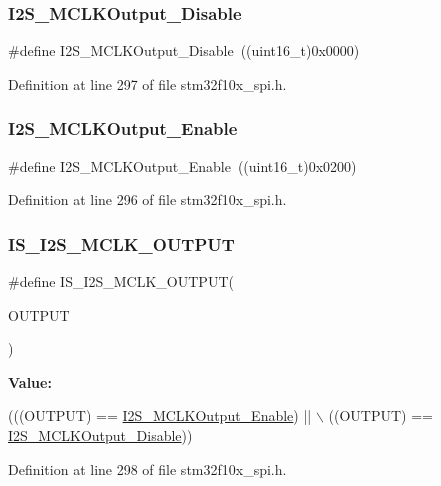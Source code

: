 \subsubsection{\texorpdfstring{I2\+S\+\_\+\+M\+C\+L\+K\+Output\+\_\+\+Disable}{I2S\_MCLKOutput\_Disable}}
{\footnotesize\ttfamily \#define I2\+S\+\_\+\+M\+C\+L\+K\+Output\+\_\+\+Disable~((uint16\+\_\+t)0x0000)}



Definition at line 297 of file stm32f10x\+\_\+spi.\+h.

\mbox{\label{group___i2_s___m_c_l_k___output_ga99713ee8c824f4d3bb25a9ce7bf5312a}} 
\subsubsection{\texorpdfstring{I2\+S\+\_\+\+M\+C\+L\+K\+Output\+\_\+\+Enable}{I2S\_MCLKOutput\_Enable}}
{\footnotesize\ttfamily \#define I2\+S\+\_\+\+M\+C\+L\+K\+Output\+\_\+\+Enable~((uint16\+\_\+t)0x0200)}



Definition at line 296 of file stm32f10x\+\_\+spi.\+h.

\mbox{\label{group___i2_s___m_c_l_k___output_ga829ae526d1d11f14592e881f800fbb8a}} 
\subsubsection{\texorpdfstring{I\+S\+\_\+\+I2\+S\+\_\+\+M\+C\+L\+K\+\_\+\+O\+U\+T\+P\+UT}{IS\_I2S\_MCLK\_OUTPUT}}
{\footnotesize\ttfamily \#define I\+S\+\_\+\+I2\+S\+\_\+\+M\+C\+L\+K\+\_\+\+O\+U\+T\+P\+UT(\begin{DoxyParamCaption}\item[{}]{O\+U\+T\+P\+UT }\end{DoxyParamCaption})}

{\bfseries Value\+:}
\begin{DoxyCode}
(((OUTPUT) == \hyperlink{group___i2_s___m_c_l_k___output_ga99713ee8c824f4d3bb25a9ce7bf5312a}{I2S\_MCLKOutput\_Enable}) || \(\backslash\)
                                    ((OUTPUT) == \hyperlink{group___i2_s___m_c_l_k___output_gaea09824d7e6359924152277ed3661e7e}{I2S\_MCLKOutput\_Disable}))
\end{DoxyCode}


Definition at line 298 of file stm32f10x\+\_\+spi.\+h.

